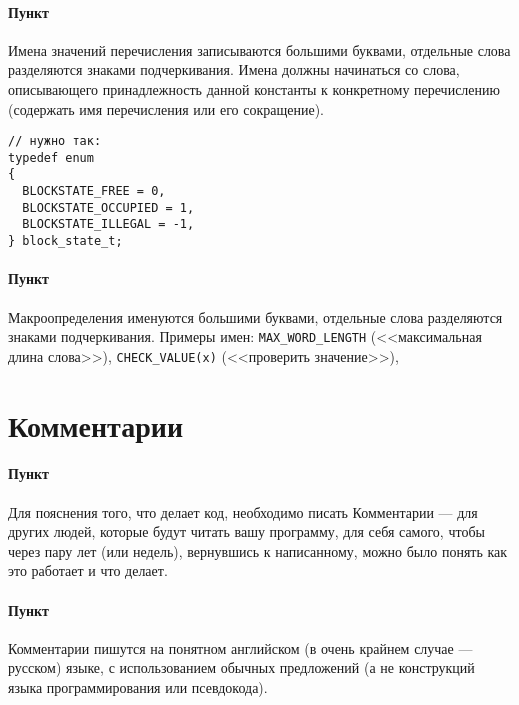 \paragraph{Пункт}

Имена значений перечисления записываются большими буквами, отдельные
слова разделяются знаками подчеркивания. Имена должны начинаться со
слова, описывающего принадлежность данной константы к конкретному
перечислению (содержать имя перечисления или его сокращение).

\begin{verbatim}
// нужно так:
typedef enum
{
  BLOCKSTATE_FREE = 0,
  BLOCKSTATE_OCCUPIED = 1,
  BLOCKSTATE_ILLEGAL = -1,
} block_state_t;
\end{verbatim}

\paragraph{Пункт}

Макроопределения именуются большими буквами, отдельные слова разделяются
знаками подчеркивания. Примеры имен: \texttt{MAX\_WORD\_LENGTH}
(<<максимальная длина слова>>), \texttt{CHECK\_VALUE(x)} (<<проверить
значение>>),


\section{Комментарии}


\paragraph{Пункт}

Для пояснения того, что делает код, необходимо писать Комментарии ---
для других людей, которые будут читать вашу программу, для себя самого,
чтобы через пару лет (или недель), вернувшись к написанному, можно было
понять как это работает и что делает.

\paragraph{Пункт}

Комментарии пишутся на понятном английском (в очень крайнем случае ---
русском) языке, с использованием обычных предложений (а не конструкций
языка программирования или псевдокода).

